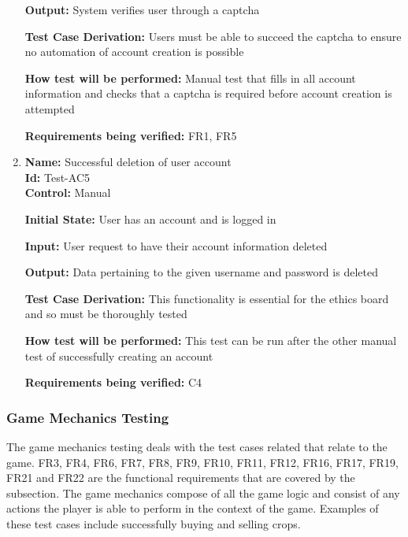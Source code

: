 \documentclass[12pt, titlepage]{article}
\begin{document}
\begin{enumerate}
\textbf{Output: }System verifies user through a captcha

\textbf{Test Case Derivation: }Users must be able to succeed the captcha to ensure no automation of account creation is possible

\textbf{How test will be performed:} Manual test that fills in all account information and checks that a captcha is required before account creation is attempted

\textbf{Requirements being verified:} FR1, FR5

\item{\textbf{Name:} Successful deletion of user account\\} %
\textbf{Id:} Test-AC5    \label{Test-AC5}\\
\textbf{Control:} Manual
					
\textbf{Initial State:} User has an account and is logged in
					
\textbf{Input:} User request to have their account information deleted
					
\textbf{Output:} Data pertaining to the given username and password is deleted

\textbf{Test Case Derivation:} This functionality is essential for the ethics board and so must be thoroughly tested

\textbf{How test will be performed:} This test can be run after the other manual test of successfully creating an account

\textbf{Requirements being verified:} C4

\end{enumerate}

\subsubsection{Game Mechanics Testing}
The game mechanics testing deals with the test cases related that relate to the game. FR3, FR4, FR6, FR7, FR8, FR9, FR10, FR11, FR12, FR16, FR17, FR19, FR21 and FR22 are the functional requirements that are covered by the subsection. The game mechanics compose of all the game logic and consist of any actions the player is able to perform in the context of the game. Examples of these test cases include successfully buying and selling crops.
\end{document}
